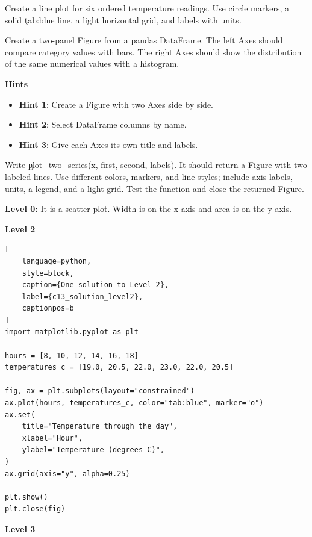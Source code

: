 
Create a line plot for six ordered temperature readings. Use circle markers,
a solid \c{tab:blue} line, a light horizontal grid, and labels with units.


Create a two-panel Figure from a pandas DataFrame. The left Axes should compare
category values with bars. The right Axes should show the distribution of the
same numerical values with a histogram.

\textbf{Hints}
\begin{itemize}
    \item \textbf{Hint 1}: Create a Figure with two Axes side by side.
    \item \textbf{Hint 2}: Select DataFrame columns by name.
    \item \textbf{Hint 3}: Give each Axes its own title and labels.
\end{itemize}


Write \c{plot_two_series(x, first, second, labels)}. It should return a Figure
with two labeled lines. Use different colors, markers, and line styles; include
axis labels, units, a legend, and a light grid. Test the function and close the
returned Figure.


\textbf{Level 0:} It is a scatter plot. Width is on the x-axis and area is on
the y-axis.

\textbf{Level 2}

\begin{lstlisting}[
    language=python,
    style=block,
    caption={One solution to Level 2},
    label={c13_solution_level2},
    captionpos=b
]
import matplotlib.pyplot as plt

hours = [8, 10, 12, 14, 16, 18]
temperatures_c = [19.0, 20.5, 22.0, 23.0, 22.0, 20.5]

fig, ax = plt.subplots(layout="constrained")
ax.plot(hours, temperatures_c, color="tab:blue", marker="o")
ax.set(
    title="Temperature through the day",
    xlabel="Hour",
    ylabel="Temperature (degrees C)",
)
ax.grid(axis="y", alpha=0.25)

plt.show()
plt.close(fig)
\end{lstlisting}

\textbf{Level 3}

